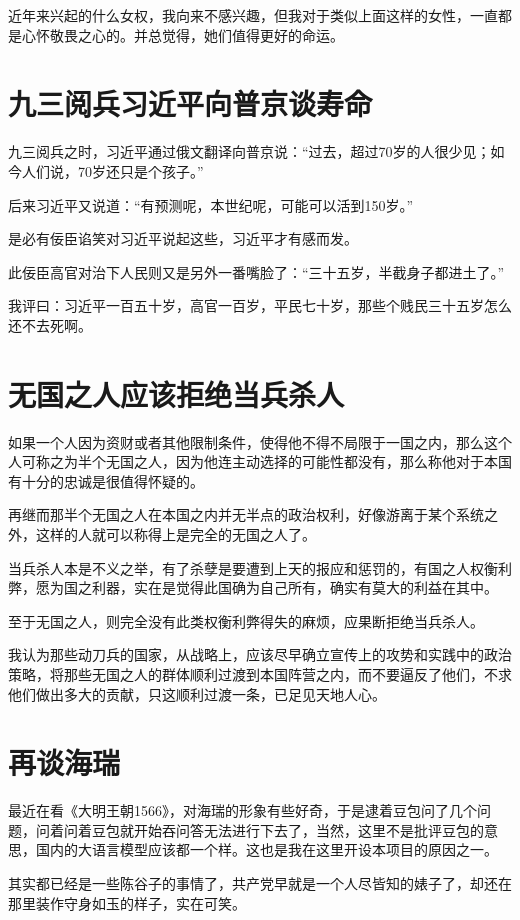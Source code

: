 \documentclass[12pt,oneside]{book}
\begin{document}
近年来兴起的什么女权，我向来不感兴趣，但我对于类似上面这样的女性，一直都是心怀敬畏之心的。并总觉得，她们值得更好的命运。




\chapter{九三阅兵习近平向普京谈寿命}
九三阅兵之时，习近平通过俄文翻译向普京说：“过去，超过70岁的人很少见；如今人们说，70岁还只是个孩子。”

后来习近平又说道：“有预测呢，本世纪呢，可能可以活到150岁。”

是必有佞臣谄笑对习近平说起这些，习近平才有感而发。

此佞臣高官对治下人民则又是另外一番嘴脸了：“三十五岁，半截身子都进土了。”

我评曰：习近平一百五十岁，高官一百岁，平民七十岁，那些个贱民三十五岁怎么还不去死啊。


\chapter{无国之人应该拒绝当兵杀人}
如果一个人因为资财或者其他限制条件，使得他不得不局限于一国之内，那么这个人可称之为半个无国之人，因为他连主动选择的可能性都没有，那么称他对于本国有十分的忠诚是很值得怀疑的。

再继而那半个无国之人在本国之内并无半点的政治权利，好像游离于某个系统之外，这样的人就可以称得上是完全的无国之人了。

当兵杀人本是不义之举，有了杀孽是要遭到上天的报应和惩罚的，有国之人权衡利弊，愿为国之利器，实在是觉得此国确为自己所有，确实有莫大的利益在其中。

至于无国之人，则完全没有此类权衡利弊得失的麻烦，应果断拒绝当兵杀人。

我认为那些动刀兵的国家，从战略上，应该尽早确立宣传上的攻势和实践中的政治策略，将那些无国之人的群体顺利过渡到本国阵营之内，而不要逼反了他们，不求他们做出多大的贡献，只这顺利过渡一条，已足见天地人心。



\chapter{再谈海瑞}
最近在看《大明王朝1566》，对海瑞的形象有些好奇，于是逮着豆包问了几个问题，问着问着豆包就开始吞问答无法进行下去了，当然，这里不是批评豆包的意思，国内的大语言模型应该都一个样。这也是我在这里开设本项目的原因之一。

其实都已经是一些陈谷子的事情了，共产党早就是一个人尽皆知的婊子了，却还在那里装作守身如玉的样子，实在可笑。
\end{document}

